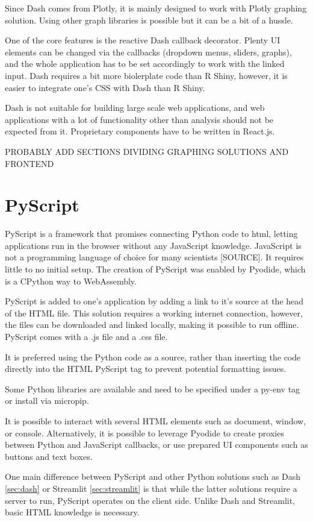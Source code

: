 Since Dash comes from Plotly, it is mainly designed to work with Plotly graphing solution. Using other graph libraries is possible but it can be a bit of a hussle. 

One of the core features is the reactive Dash callback decorator. Plenty UI elements can be changed via the callbacks (dropdown menus, sliders, graphs), and the whole application has to be set accordingly to work with the linked input. Dash requires a bit more biolerplate code than R Shiny, however, it is easier to integrate one's CSS with Dash than R Shiny.

Dash is not suitable for building large scale web applications, and web applications with a lot of functionality other than analysis should not be expected from it. Proprietary components have to be written in React.js. 

PROBABLY ADD SECTIONS DIVIDING GRAPHING SOLUTIONS AND FRONTEND

\section{PyScript}
\label{sec:pyscript}
PyScript is a framework that promises connecting Python code to html, letting applications run in the browser without any JavaScript knowledge. JavaScript is not a programming language of choice for many scientists [SOURCE]. It requires little to no initial setup. The creation of PyScript was enabled by Pyodide, which is a CPython way to WebAssembly. 

PyScript is added to one's application by adding a link to it's source at the head of the HTML file. This solution requires a working internet connection, however, the files can be downloaded and linked locally, making it possible to run offline. PyScript comes with a .js file and a .css file. 

It is preferred using the Python code as a source, rather than inserting the code directly into the HTML PyScript tag to prevent potential formatting issues. 

Some Python libraries are available and need to be specified under a py-env tag or install via micropip. 

It is possible to interact with several HTML elements such as document, window, or console. Alternatively, it is possible to leverage Pyodide to create proxies between Python and JavaScript callbacks, or use prepared UI components such as buttons and text boxes. 

One main difference between PyScript and other Python solutions such as Dash \ref{sec:dash} or Streamlit \ref{sec:streamlit} is that while the latter solutions require a server to run, PyScript operates on the client side. Unlike Dash and Streamlit, basic HTML knowledge is necessary. 

